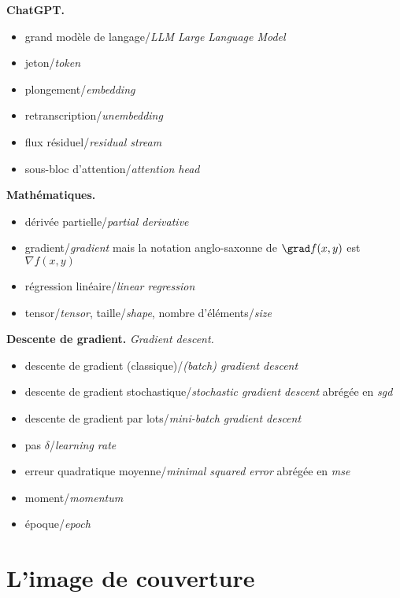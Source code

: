 \documentclass[11pt,class=report,crop=false]{standalone}
\begin{document}
\medskip

\textbf{ChatGPT.} 

\begin{itemize}
	\item grand modèle de langage/\emph{LLM Large Language Model}
	\item jeton/\emph{token}	
	\item plongement/\emph{embedding}
	\item retranscription/\emph{unembedding}
	\item flux résiduel/\emph{residual stream}
	\item sous-bloc d'attention/\emph{attention head}
\end{itemize} 

\medskip
\textbf{Mathématiques.}

\begin{itemize}
  \item dérivée partielle/\emph{partial derivative}
  \item gradient/\emph{gradient} mais la notation anglo-saxonne de $\grad f(x,y)$ est $\nabla f(x,y)$
  \item régression linéaire/\emph{linear regression}
  \item tensor/\emph{tensor}, taille/\emph{shape}, nombre d'éléments/\emph{size}
\end{itemize} 
 
 
\medskip
 
\textbf{Descente de gradient.} \emph{Gradient descent.}

\begin{itemize}
 \item descente de gradient (classique)/\emph{(batch) gradient descent}
 \item descente de gradient stochastique/\emph{stochastic gradient descent} abrégée en \emph{sgd}
 \item descente de gradient par lots/\emph{mini-batch gradient descent}
 \item pas $\delta$/\emph{learning rate}
 \item erreur quadratique moyenne/\emph{minimal squared error} abrégée en \emph{mse}
 \item moment/\emph{momentum}
 \item époque/\emph{epoch}
\end{itemize}  

\section{L'image de couverture}
\end{document}

